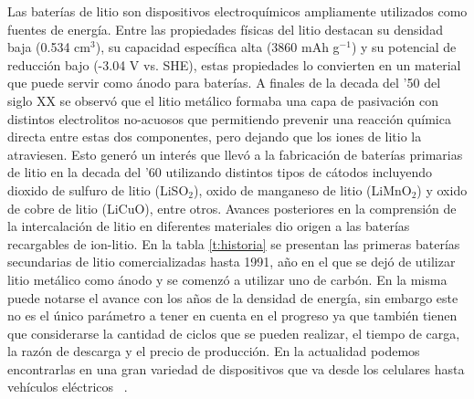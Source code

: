 Las baterías de litio son dispositivos electroquímicos ampliamente utilizados 
como fuentes de energía. Entre las propiedades físicas del litio destacan su 
densidad baja (0.534 cm$^3$), su capacidad específica alta (3860 mAh g$^{-1}$) y
su potencial de reducción bajo (-3.04 V vs. SHE), estas propiedades lo convierten
en un material que puede servir como ánodo para baterías. A finales de la decada
del '50 del siglo XX se observó que el litio metálico formaba una capa de 
pasivación con distintos electrolitos no-acuosos que permitiendo prevenir una 
reacción química directa entre estas dos componentes, pero dejando que los iones 
de litio la atraviesen. Esto generó un interés que llevó a la fabricación de 
baterías primarias de litio en la decada del '60 utilizando distintos tipos de 
cátodos incluyendo dioxido de sulfuro de litio (LiSO$_2$), oxido de manganeso de 
litio (LiMnO$_2$) y oxido de cobre de litio (LiCuO), entre otros. Avances 
posteriores en la comprensión de la intercalación de litio en diferentes 
materiales dio origen a las baterías recargables de ion-litio. En la tabla 
\ref{t:historia} se presentan las primeras baterías secundarias de litio 
comercializadas hasta 1991, año en el que se dejó de utilizar litio metálico como
ánodo y se comenzó a utilizar uno de carbón. En la misma puede notarse el avance 
con los años de la densidad de energía, sin embargo este no es el único parámetro 
a tener en cuenta en el progreso ya que también tienen que considerarse la 
cantidad de ciclos que se pueden realizar, el tiempo de carga, la razón de 
descarga y el precio de producción. En la actualidad podemos encontrarlas en una 
gran variedad de dispositivos que va desde los celulares hasta vehículos 
eléctricos ~\cite{reddy2020}. 
